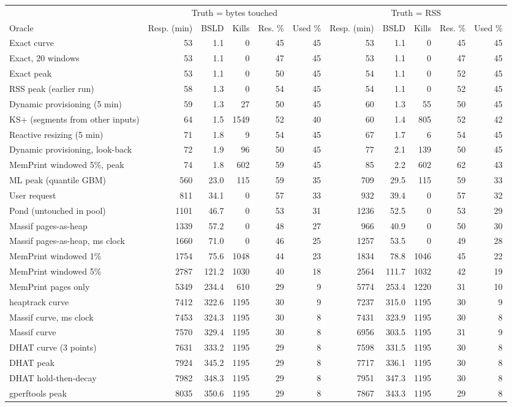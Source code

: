\begin{tabular}{lrrrrrrrrrr}
\toprule
 & \multicolumn{5}{c}{Truth = bytes touched} & \multicolumn{5}{c}{Truth = RSS} \\
\cmidrule(lr){2-6} \cmidrule(lr){7-11}
Oracle & Resp. (min) & BSLD & Kills & Res. \% & Used \% & Resp. (min) & BSLD & Kills & Res. \% & Used \% \\
\midrule
Exact curve & 53 & 1.1 & 0 & 45 & 45 & 53 & 1.1 & 0 & 45 & 45 \\
Exact, 20 windows & 53 & 1.1 & 0 & 47 & 45 & 53 & 1.1 & 0 & 47 & 45 \\
Exact peak & 53 & 1.1 & 0 & 50 & 45 & 54 & 1.1 & 0 & 52 & 45 \\
RSS peak (earlier run) & 58 & 1.3 & 0 & 54 & 45 & 54 & 1.1 & 0 & 52 & 45 \\
Dynamic provisioning (5 min) & 59 & 1.3 & 27 & 50 & 45 & 60 & 1.3 & 55 & 50 & 45 \\
KS+ (segments from other inputs) & 64 & 1.5 & 1549 & 52 & 40 & 60 & 1.4 & 805 & 52 & 42 \\
Reactive resizing (5 min) & 71 & 1.8 & 9 & 54 & 45 & 67 & 1.7 & 6 & 54 & 45 \\
Dynamic provisioning, look-back & 72 & 1.9 & 96 & 50 & 45 & 77 & 2.1 & 139 & 50 & 45 \\
MemPrint windowed 5\%, peak & 74 & 1.8 & 602 & 59 & 45 & 85 & 2.2 & 602 & 62 & 43 \\
ML peak (quantile GBM) & 560 & 23.0 & 115 & 59 & 35 & 709 & 29.5 & 115 & 59 & 33 \\
User request & 811 & 34.1 & 0 & 57 & 33 & 932 & 39.4 & 0 & 57 & 32 \\
Pond (untouched in pool) & 1101 & 46.7 & 0 & 53 & 31 & 1236 & 52.5 & 0 & 53 & 29 \\
Massif pages-as-heap & 1339 & 57.2 & 0 & 48 & 27 & 966 & 40.9 & 0 & 50 & 30 \\
Massif pages-as-heap, ms clock & 1660 & 71.0 & 0 & 46 & 25 & 1257 & 53.5 & 0 & 49 & 28 \\
MemPrint windowed 1\% & 1754 & 75.6 & 1048 & 44 & 23 & 1834 & 78.8 & 1046 & 45 & 22 \\
MemPrint windowed 5\% & 2787 & 121.2 & 1030 & 40 & 18 & 2564 & 111.7 & 1032 & 42 & 19 \\
MemPrint pages only & 5349 & 234.4 & 610 & 29 & 9 & 5774 & 253.4 & 1220 & 31 & 10 \\
heaptrack curve & 7412 & 322.6 & 1195 & 30 & 9 & 7237 & 315.0 & 1195 & 30 & 9 \\
Massif curve, ms clock & 7453 & 324.3 & 1195 & 30 & 8 & 7431 & 323.9 & 1195 & 30 & 8 \\
Massif curve & 7570 & 329.4 & 1195 & 30 & 8 & 6956 & 303.5 & 1195 & 31 & 9 \\
DHAT curve (3 points) & 7631 & 333.2 & 1195 & 29 & 8 & 7598 & 331.5 & 1195 & 30 & 8 \\
DHAT peak & 7924 & 345.2 & 1195 & 29 & 8 & 7717 & 336.1 & 1195 & 30 & 8 \\
DHAT hold-then-decay & 7982 & 348.3 & 1195 & 29 & 8 & 7951 & 347.3 & 1195 & 30 & 8 \\
gperftools peak & 8035 & 350.6 & 1195 & 29 & 8 & 7867 & 343.3 & 1195 & 29 & 8 \\
\bottomrule
\end{tabular}
